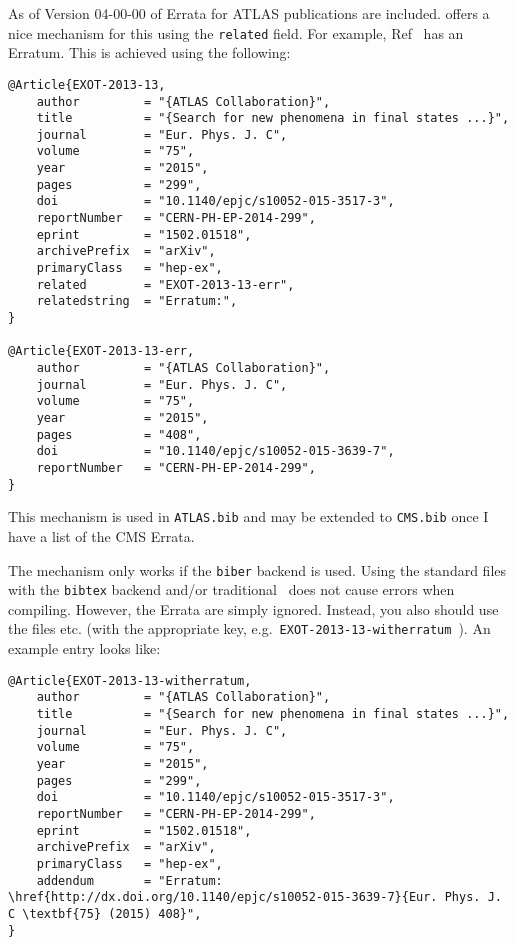 \documentclass[UKenglish, texlive=2016]{\ATLASLATEXPATH atlasdoc}
\begin{document}
As of Version 04-00-00 of  Errata for ATLAS publications are included.
 offers a nice mechanism for this using the \texttt{related} field.
For example, Ref~\cite{EXOT-2013-13} has an Erratum.
This is achieved using the following:
\begin{verbatim}
@Article{EXOT-2013-13,
    author         = "{ATLAS Collaboration}",
    title          = "{Search for new phenomena in final states ...}",
    journal        = "Eur. Phys. J. C",
    volume         = "75",
    year           = "2015",
    pages          = "299",
    doi            = "10.1140/epjc/s10052-015-3517-3",
    reportNumber   = "CERN-PH-EP-2014-299",
    eprint         = "1502.01518",
    archivePrefix  = "arXiv",
    primaryClass   = "hep-ex",
    related        = "EXOT-2013-13-err",
    relatedstring  = "Erratum:",
}

@Article{EXOT-2013-13-err,
    author         = "{ATLAS Collaboration}",
    journal        = "Eur. Phys. J. C",
    volume         = "75",
    year           = "2015",
    pages          = "408",
    doi            = "10.1140/epjc/s10052-015-3639-7",
    reportNumber   = "CERN-PH-EP-2014-299",
}
\end{verbatim}

This mechanism is used in \texttt{ATLAS.bib} and may be extended to \texttt{CMS.bib} once
I have a list of the CMS Errata.

The mechanism only works if the \texttt{biber} backend is used.
Using the standard files with the \texttt{bibtex} backend and/or traditional \BibTeX\ does not cause errors when compiling.
However, the Errata are simply ignored.
Instead, you also should use the files  etc.
(with the appropriate key, e.g.~\texttt{EXOT-2013-13-witherratum}~\cite{EXOT-2013-13-witherratum}).
An example entry looks like:
\begin{verbatim}
@Article{EXOT-2013-13-witherratum,
    author         = "{ATLAS Collaboration}",
    title          = "{Search for new phenomena in final states ...}",
    journal        = "Eur. Phys. J. C",
    volume         = "75",
    year           = "2015",
    pages          = "299",
    doi            = "10.1140/epjc/s10052-015-3517-3",
    reportNumber   = "CERN-PH-EP-2014-299",
    eprint         = "1502.01518",
    archivePrefix  = "arXiv",
    primaryClass   = "hep-ex",
    addendum       = "Erratum: \href{http://dx.doi.org/10.1140/epjc/s10052-015-3639-7}{Eur. Phys. J. C \textbf{75} (2015) 408}",
}
\end{verbatim}
\end{document}
